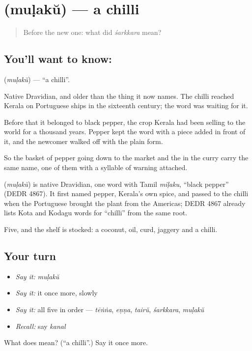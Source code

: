 \section[\texorpdfstring{\ml{മുളക്} (muḷakŭ)}{മുളക് (muḷakŭ)}]{ (muḷakŭ) — a chilli}

\label{lesson:ML-C61-chilli}



\begin{quote}
Before the new one: what did \emph{śarkkara} mean?
\end{quote}

\subsection*{You'll want to know: }
\textbf{} (\emph{muḷakŭ}) — \textquotedblleft{}a chilli\textquotedblright{}.

Native Dravidian, and older than the thing it now names. The chilli reached Kerala on Portuguese ships in the sixteenth century; the word was waiting for it.

Before that it belonged to black pepper, the crop Kerala had been selling to the world for a thousand years. Pepper kept the word with a piece added in front of it, and the newcomer walked off with the plain form.

So the basket of pepper going down to the market and the  in the curry carry the same name, one of them with a syllable of warning attached.

\begin{cousinweb}
\textbf{} (\emph{muḷakŭ}) is native Dravidian, one word with Tamil \emph{miḷaku}, \textquotedblleft{}black pepper\textquotedblright{} (DEDR 4867). It first named pepper, Kerala's own spice, and passed to the chilli when the Portuguese brought the plant from the Americas; DEDR 4867 already lists Kota and Kodagu words for \textquotedblleft{}chilli\textquotedblright{} from the same root.
\end{cousinweb}

\begin{grammarlens}[title={What you've built}]
Five, and the shelf is stocked: a coconut, oil, curd, jaggery and a chilli.
\end{grammarlens}

\subsection*{Your turn}
\begin{itemize}
\raggedright
  \item \emph{Say it:} \emph{muḷakŭ}
  \item \emph{Say it:} it once more, slowly
  \item \emph{Say it:} all five in order — \emph{tēṅṅa}, \emph{eṇṇa}, \emph{tairŭ}, \emph{śarkkara}, \emph{muḷakŭ}
  \item \emph{Recall:} say \emph{kanal}
\end{itemize}

\begin{tcolorbox}[breakable,colback=teal!4,colframe=teal!35!black,title={Before you move on}]
What does  mean? (\textquotedblleft{}a chilli\textquotedblright{}.) Say it once more.
\end{tcolorbox}
